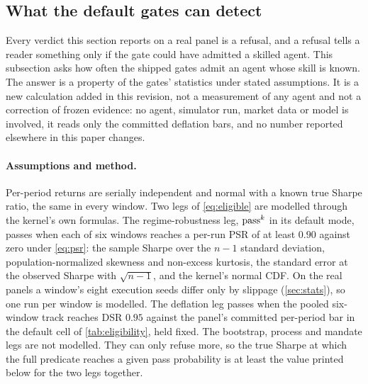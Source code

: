 
\subsection{What the default gates can detect}\label{sec:power}

Every verdict this section reports on a real panel is a refusal, and a refusal tells a reader something only if the gate could have admitted a skilled agent. This subsection asks how often the shipped gates admit an agent whose skill is known. The answer is a property of the gates' statistics under stated assumptions. It is a new calculation added in this revision, not a measurement of any agent and not a correction of frozen evidence: no agent, simulator run, market data or model is involved, it reads only the committed deflation bars, and no number reported elsewhere in this paper changes.

\paragraph{Assumptions and method.} Per-period returns are serially independent and normal with a known true Sharpe ratio, the same in every window. Two legs of \cref{eq:eligible} are modelled through the kernel's own formulas. The regime-robustness leg, $\text{pass}^{k}$ in its default mode, passes when each of six windows reaches a per-run PSR of at least $0.90$ against zero under \cref{eq:psr}: the sample Sharpe over the $n-1$ standard deviation, population-normalized skewness and non-excess kurtosis, the standard error at the observed Sharpe with $\sqrt{n-1}$, and the kernel's normal CDF. On the real panels a window's eight execution seeds differ only by slippage (\cref{sec:stats}), so one run per window is modelled. The deflation leg passes when the pooled six-window track reaches DSR $0.95$ against the panel's committed per-period bar in the default cell of \cref{tab:eligibility}, held fixed. The bootstrap, process and mandate legs are not modelled. They can only refuse more, so the true Sharpe at which the full predicate reaches a given pass probability is at least the value printed below for the two legs together.


